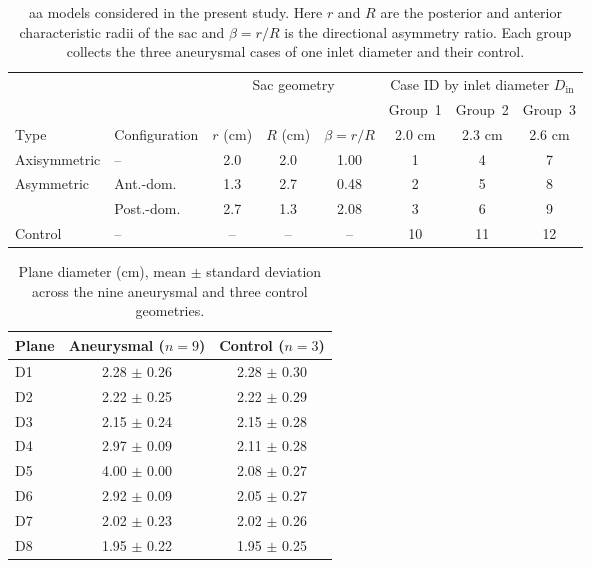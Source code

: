 \documentclass[12pt,a4paper]{article}
\newcommand{\AANcap}{\Ac{aa}\xspace}
\theoremstyle{definition}
\numberwithin{equation}{section}
\begin{document}
\begin{table}[htbp]
\centering
\caption{\AANcap models considered in the present study. Here $r$ and $R$ are the {posterior and anterior} characteristic radii of the sac and $\beta = r/R$ is the directional asymmetry ratio. Each group collects the three aneurysmal cases of one inlet diameter and their control.}
\label{tab:geometries}
\setlength{\tabcolsep}{4pt}
\begin{tabular}{ll ccc ccc}
\toprule
& & \multicolumn{3}{c}{Sac geometry}
  & \multicolumn{3}{c}{Case ID by inlet diameter \(D_{\mathrm{in}}\)} \\
\cmidrule(lr){3-5} \cmidrule(lr){6-8}
& & & & & Group~1 & Group~2 & Group~3 \\
Type & Configuration & \(r\) (cm) & \(R\) (cm) & \(\beta = r/R\)
     & 2.0 cm & 2.3 cm & 2.6 cm \\
\midrule
Axisymmetric & --         & 2.0 & 2.0 & 1.00 & 1  & 4  & 7  \\
Asymmetric   & Ant.-dom.  & 1.3 & 2.7 & 0.48 & 2  & 5  & 8  \\
             & Post.-dom. & 2.7 & 1.3 & 2.08 & 3  & 6  & 9  \\
Control      & --         & --  & --  & --   & 10 & 11 & 12 \\
\bottomrule
\end{tabular}
\end{table}
\begin{table}[htbp]
\centering
\caption{Plane diameter (cm), mean $\pm$ standard deviation across the nine aneurysmal and three control geometries.}
\begin{tabular}{lcc}
\toprule
Plane & Aneurysmal ($n=9$) & Control ($n=3$) \\
\midrule
D1 & 2.28 $\pm$ 0.26 & 2.28 $\pm$ 0.30 \\
D2 & 2.22 $\pm$ 0.25 & 2.22 $\pm$ 0.29 \\
D3 & 2.15 $\pm$ 0.24 & 2.15 $\pm$ 0.28 \\
D4 & 2.97 $\pm$ 0.09 & 2.11 $\pm$ 0.28 \\
D5 & 4.00 $\pm$ 0.00 & 2.08 $\pm$ 0.27 \\
D6 & 2.92 $\pm$ 0.09 & 2.05 $\pm$ 0.27 \\
D7 & 2.02 $\pm$ 0.23 & 2.02 $\pm$ 0.26 \\
D8 & 1.95 $\pm$ 0.22 & 1.95 $\pm$ 0.25 \\
\bottomrule
\end{tabular}
\label{tab:diameter}
\end{table}
\end{document}
